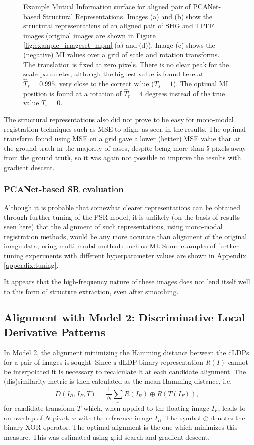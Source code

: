 \documentclass{report}
\begin{document}
\begin{figure}
\caption{Example Mutual Information surface for aligned pair of PCANet-based Structural Representations. Images (a) and (b) show the structural representations of an aligned pair of SHG and TPEF images (original images are shown in Figure \ref{fig:example_imageset_mpm} (a) and (d)). Image (c) shows the (negative) MI values over a grid of scale and rotation transforms. The translation is fixed at zero pixels. There is no clear peak for the scale parameter, although the highest value is found here at $\hat{T}_s = 0.995$, very close to the correct value ($T_s = 1$). The optimal MI position is found at a rotation of $\hat{T}_r = 4$ degrees instead of the true value $T_r = 0$.}
\label{fig:MIsurfacePSR}
\end{figure}

The structural representations also did not prove to be easy for mono-modal registration techniques such as MSE %
to align, as seen in the results. The optimal transform found using MSE on a grid gave a lower (better) MSE value than at the ground truth in the majority of cases, despite being more than 5 pixels away from the ground truth, so it was again not possible to improve the results with gradient descent.

\subsubsection{PCANet-based SR evaluation}
Although it is probable that somewhat clearer representations can be obtained through further tuning of the PSR model, it is unlikely (on the basis of results seen here) that the alignment of such representations, using mono-modal registration methods, would be any more accurate than alignment of the original image data, using multi-modal methods such as MI. Some examples of further tuning experiments with different hyperparameter values are shown in Appendix \ref{appendix:tuning}. 

It appears that the high-frequency nature of these images does not lend itself well to this form of structure extraction, even after smoothing.

\subsection{Alignment with Model 2: Discriminative Local Derivative Patterns}
\label{sec:model2_results}
In Model 2, the alignment minimizing the Hamming distance between the dLDPs for a pair of images is sought. Since a dLDP binary representation $R(I)$ cannot be interpolated it is necessary to recalculate it at each candidate alignment. The (dis)similarity metric is then calculated as the mean Hamming distance, i.e.
\[
D(I_R, I_F, T) = \frac{1}{N} \sum_x R(I_R) \oplus R(T(I_F)),
\]
for candidate transform $T$ which, when applied to the floating image $I_F$, leads to an overlap of $N$ pixels $x$ with the reference image $I_R$. The symbol $\oplus$ denotes the binary XOR operator. The optimal alignment is the one which minimizes this measure. This was estimated using grid search and gradient descent.
\end{document}
